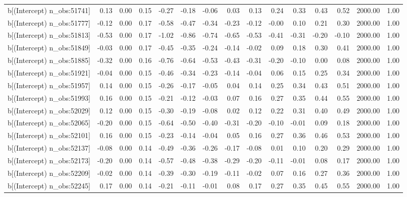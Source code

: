 \begin{table}[ht]
\begin{tabular}{rrrrrrrrrrrrrrr}
  b[(Intercept) n\_obs:51741] & 0.13 & 0.00 & 0.15 & -0.27 & -0.18 & -0.06 & 0.03 & 0.13 & 0.24 & 0.33 & 0.43 & 0.52 & 2000.00 & 1.00 \\ 
  b[(Intercept) n\_obs:51777] & -0.12 & 0.00 & 0.17 & -0.58 & -0.47 & -0.34 & -0.23 & -0.12 & -0.00 & 0.10 & 0.21 & 0.30 & 2000.00 & 1.00 \\ 
  b[(Intercept) n\_obs:51813] & -0.53 & 0.00 & 0.17 & -1.02 & -0.86 & -0.74 & -0.65 & -0.53 & -0.41 & -0.31 & -0.20 & -0.10 & 2000.00 & 1.00 \\ 
  b[(Intercept) n\_obs:51849] & -0.03 & 0.00 & 0.17 & -0.45 & -0.35 & -0.24 & -0.14 & -0.02 & 0.09 & 0.18 & 0.30 & 0.41 & 2000.00 & 1.00 \\ 
  b[(Intercept) n\_obs:51885] & -0.32 & 0.00 & 0.16 & -0.76 & -0.64 & -0.53 & -0.43 & -0.31 & -0.20 & -0.10 & 0.00 & 0.08 & 2000.00 & 1.00 \\ 
  b[(Intercept) n\_obs:51921] & -0.04 & 0.00 & 0.15 & -0.46 & -0.34 & -0.23 & -0.14 & -0.04 & 0.06 & 0.15 & 0.25 & 0.34 & 2000.00 & 1.00 \\ 
  b[(Intercept) n\_obs:51957] & 0.14 & 0.00 & 0.15 & -0.26 & -0.17 & -0.05 & 0.04 & 0.14 & 0.25 & 0.34 & 0.43 & 0.51 & 2000.00 & 1.00 \\ 
  b[(Intercept) n\_obs:51993] & 0.16 & 0.00 & 0.15 & -0.21 & -0.12 & -0.03 & 0.07 & 0.16 & 0.27 & 0.35 & 0.44 & 0.55 & 2000.00 & 1.00 \\ 
  b[(Intercept) n\_obs:52029] & 0.12 & 0.00 & 0.15 & -0.30 & -0.19 & -0.08 & 0.02 & 0.12 & 0.22 & 0.31 & 0.40 & 0.49 & 2000.00 & 1.00 \\ 
  b[(Intercept) n\_obs:52065] & -0.20 & 0.00 & 0.15 & -0.64 & -0.50 & -0.40 & -0.31 & -0.20 & -0.10 & -0.01 & 0.09 & 0.18 & 2000.00 & 1.00 \\ 
  b[(Intercept) n\_obs:52101] & 0.16 & 0.00 & 0.15 & -0.23 & -0.14 & -0.04 & 0.05 & 0.16 & 0.27 & 0.36 & 0.46 & 0.53 & 2000.00 & 1.00 \\ 
  b[(Intercept) n\_obs:52137] & -0.08 & 0.00 & 0.14 & -0.49 & -0.36 & -0.26 & -0.17 & -0.08 & 0.01 & 0.10 & 0.20 & 0.29 & 2000.00 & 1.00 \\ 
  b[(Intercept) n\_obs:52173] & -0.20 & 0.00 & 0.14 & -0.57 & -0.48 & -0.38 & -0.29 & -0.20 & -0.11 & -0.01 & 0.08 & 0.17 & 2000.00 & 1.00 \\ 
  b[(Intercept) n\_obs:52209] & -0.02 & 0.00 & 0.14 & -0.39 & -0.30 & -0.19 & -0.11 & -0.02 & 0.07 & 0.16 & 0.27 & 0.36 & 2000.00 & 1.00 \\ 
  b[(Intercept) n\_obs:52245] & 0.17 & 0.00 & 0.14 & -0.21 & -0.11 & -0.01 & 0.08 & 0.17 & 0.27 & 0.35 & 0.45 & 0.55 & 2000.00 & 1.00 \\ 

\end{tabular}
\end{table}
